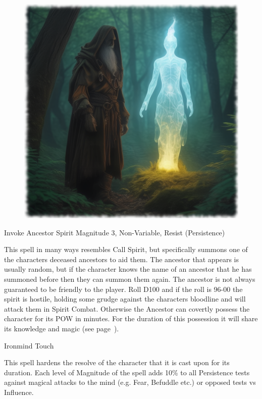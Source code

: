 \begin{figure}[h]
\begin{center}
\includegraphics[scale=0.24]{img/ai-images/invoke-spirit.png}
\end{center}
\end{figure}

\begin{rpg-spell}
{Invoke Ancestor Spirit}
{Magnitude 3, Non-Variable, Resist (Persistence)}

This spell in many ways resembles Call Spirit, but specifically summons one of the characters deceased ancestors to aid them. The ancestor that appears is usually random, but if the character knows the name of an ancestor that he has summoned before then they can summon them again. The ancestor is not always guaranteed to be friendly to the player. Roll D100 and if the roll is 96-00 the spirit is hostile, holding some grudge against the characters bloodline and will attack them in Spirit Combat. Otherwise the Ancestor can covertly possess the character for its POW in minutes. For the duration of this possession it will share its knowledge and magic (see page~\pageref{sec:spirits}).
\end{rpg-spell}


\begin{rpg-spell}
{Ironmind}
{Touch}

This spell hardens the resolve of the character that it is cast upon for its duration. Each level of Magnitude of the spell adds 10\% to all Persistence tests against magical attacks to the mind (e.g. Fear, Befuddle etc.) or opposed tests vs Influence.
\end{rpg-spell}


